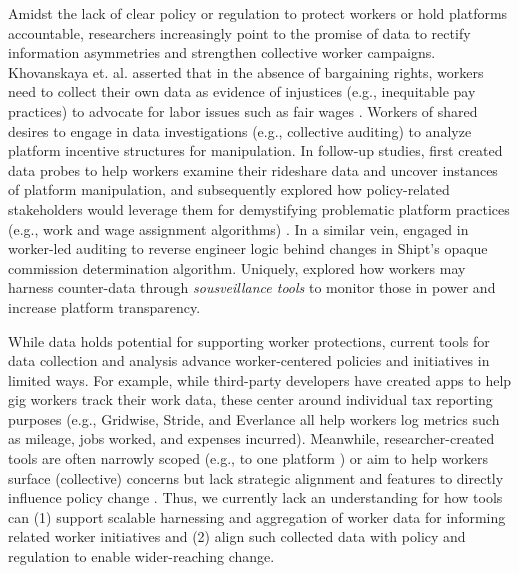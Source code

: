 {Amidst the lack of clear policy or regulation to protect workers or hold platforms accountable, researchers increasingly point} to the {promise} of data to rectify information {asymmetries} and strengthen {collective worker} campaigns. 
Khovanskaya et. al. asserted that in the absence of bargaining rights, workers need to collect their own data {as evidence of injustices (e.g., inequitable pay practices)} to advocate for labor issues such as fair wages \cite{khovanskaya2019tools}. 
Workers of \citet{zhang2022algorithmic} shared desires to engage in data investigations (e.g., collective auditing) to analyze platform incentive structures for manipulation. 
In follow-up studies, \citet{zhang2023stakeholder} {first} created data probes {to help workers examine their rideshare data and uncover instances} of platform manipulation{, and subsequently explored how policy-related stakeholders would leverage them for demystifying problematic platform practices (e.g., work and wage assignment algorithms) \cite{policy_probes}}. {In a similar vein,} \citet{6B4U} engaged in worker-led auditing to reverse engineer logic behind changes in {Shipt's} {opaque} commission determination algorithm. 
{Uniquely,} \citet{sousveillance} {explored how workers may harness counter-data through \textit{sousveillance tools} to monitor those in power and increase platform transparency}. 

{While data holds potential for supporting worker protections, current tools for data collection and analysis advance worker-centered policies and initiatives in limited ways. For example, while third-party developers have created apps to help gig workers track their work data, these center around individual tax reporting purposes (e.g., Gridwise, Stride, and Everlance all help workers log metrics such as mileage, jobs worked, and expenses incurred). Meanwhile, researcher-created tools are often narrowly scoped (e.g., to one platform \cite{6B4U}) or aim to help workers surface (collective) concerns but lack strategic alignment and features to directly influence policy change \cite{zhang2023stakeholder, weclock, savage2024unveiling}. Thus, we currently lack an understanding for how tools can (1) support scalable harnessing and aggregation of worker data for informing related worker initiatives and (2) align such collected data with policy and regulation to enable wider-reaching change.} 



